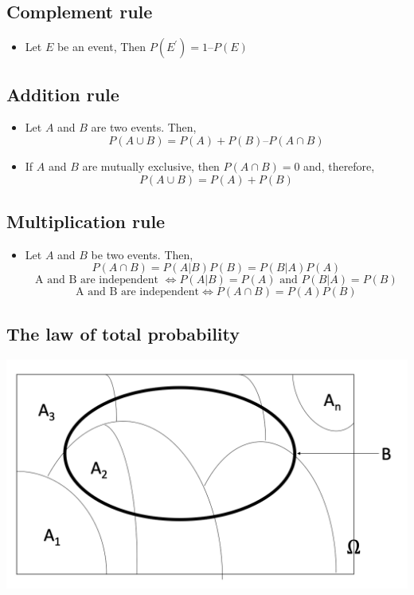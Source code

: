 \documentclass[]{book}
\providecommand{\tightlist}{%
  \setlength{\itemsep}{0pt}\setlength{\parskip}{0pt}}
\begin{document}
\hypertarget{complement-rule}{%
\subsection{Complement rule}\label{complement-rule}}

\begin{itemize}
\tightlist
\item
  Let \(E\) be an event, Then \(P(E^\prime) = 1 –P(E)\)
\end{itemize}

\hypertarget{addition-rule}{%
\subsection{Addition rule}\label{addition-rule}}

\begin{itemize}
\tightlist
\item
  Let \(A\) and \(B\) are two events. Then,
  \[P(A \cup B) = P(A) + P(B) – P(A \cap B)\]
\item
  If \(A\) and \(B\) are mutually exclusive, then \(P(A \cap B) = 0\) and, therefore,
  \[P(A \cup B) = P(A) + P(B)\]
\end{itemize}

\hypertarget{multiplication-rule}{%
\subsection{Multiplication rule}\label{multiplication-rule}}

\begin{itemize}
\tightlist
\item
  Let \(A\) and \(B\) be two events. Then,
  \[P(A \cap B) = P(A|B)P(B) = P(B|A)P(A)\]
  \[\text{A and B are independent } \iff P(A|B) = P(A) \text{ and } P(B|A) = P(B)\]
  \[\text{A and B are independent} \iff P(A \cap B) = P(A) P(B)\]
\end{itemize}

\hypertarget{the-law-of-total-probability}{%
\subsection{The law of total probability}\label{the-law-of-total-probability}}

\begin{center}\includegraphics[width=0.7\linewidth]{figure/totprob} \end{center}
\end{document}
